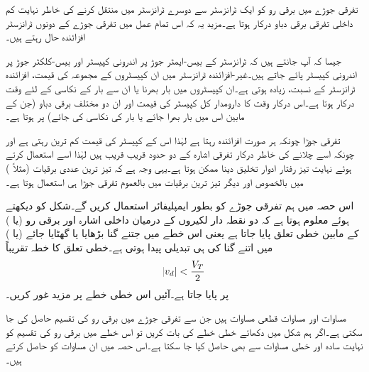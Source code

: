 تفرقی جوڑے میں برقی رو کو ایک ٹرانزسٹر سے دوسرے ٹرانزسٹر میں منتقل کرنے کی خاطر نہایت کم داخلی تفرقی برقی دباو درکار ہوتا ہے۔مزید یہ کہ اس تمام عمل میں تفرقی جوڑے کے دونوں ٹرانزسٹر افزائندہ حال رہتے ہیں۔

جیسا کہ آپ جانتے ہیں کہ ٹرانزسٹر کے بیس-ایمٹر جوڑ پر اندرونی کپیسٹر   اور بیس-کلکٹر  جوڑ پر اندرونی کپیسٹر   پائے جاتے ہیں۔غیر-افزائندہ ٹرانزسٹر میں ان کپیسٹروں کے مجموعہ کی قیمت، افزائندہ ٹرانزسٹر کے نسبت، زیادہ ہوتی ہے۔ان کپیسٹروں میں بار بھرنا یا ان سے بار کے نکاسی کے لئے وقت درکار ہوتا ہے۔اس درکار وقت کا دارومدار کل کپیسٹر کی قیمت اور ان دو مختلف برقی دباو (جن کے مابین اس میں بار بھرا جائے یا بار کی نکاسی کی جائے) پر ہوتا ہے۔

تفرقی جوڑا چونکہ ہر صورت افزائندہ رہتا ہے لہٰذا اس کے کپیسٹر کی قیمت کم ترین رہتی ہے اور چونکہ اسے چلانے کی خاطر درکار تفرقی اشارہ   کے دو حدود  قریب قریب ہیں لہٰذا اسے استعمال کرتے ہوئے نہایت تیز رفتار ادوار تخلیق دینا ممکن ہوتا ہے۔یہی وجہ ہے کہ تیز ترین عددی برقیات (مثلاً  ) میں بالخصوص اور دیگر تیز ترین برقیات میں بالعموم تفرقی جوڑا ہی استعمال ہوتا ہے۔



اس حصہ میں ہم تفرقی جوڑے کو بطور ایمپلیفائر استعمال کریں گے۔شکل   کو دیکھتے ہوئے معلوم ہوتا ہے کہ دو نقطہ دار لکیروں کے درمیان داخلی اشارہ  اور برقی رو   (یا ) کے مابین خطی تعلق پایا جاتا ہے یعنی اس خطے میں  جتنے گنا بڑھایا یا گھٹایا جائے  (یا  ) میں اتنے گنا کی ہی تبدیلی پیدا ہوتی ہے۔خطی تعلق کا خطہ تقریباً
\begin{align}
\abs{v_d} < \frac{V_T}{2}
\end{align}
پر پایا جاتا ہے۔آئیں اس خطی خطے پر مزید غور کریں۔

مساوات   اور مساوات   قطعی مساوات ہیں جن سے تفرقی جوڑے میں برقی رو کی تقسیم حاصل کی جا سکتی ہے۔اگر ہم شکل  میں دکھائے خطی خطے کی بات کریں تو اس خطے میں برقی رو کی تقسیم کو نہایت سادہ اور خطی مساوات سے بھی حاصل کیا جا سکتا ہے۔اس حصہ میں ان مساوات کو حاصل کرتے ہیں۔

